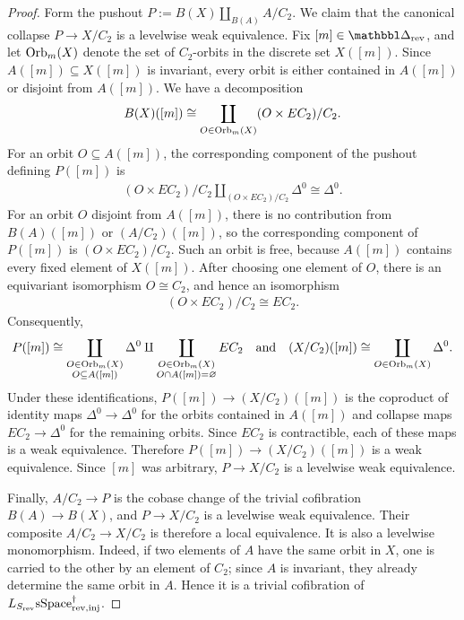 \documentclass[a4paper,dvipdfmx,11pt]{amsart}
\begin{document}
\begin{proof}
  Form the pushout $P:=B(X)\amalg_{B(A)}A/C_2$.
  We claim that the canonical collapse $P \to X/C_2$ is a levelwise weak equivalence.
  Fix $[m]\in\prism_{\rev}$, and let $\operatorname{Orb}_m(X)$ denote the set of $C_2$-orbits in the discrete set $X([m])$.
  Since $A([m])\subseteq X([m])$ is invariant, every orbit is either contained in $A([m])$ or disjoint from $A([m])$.
  We have a decomposition
  \begin{align}
    B(X)([m])
    \cong
    \coprod_{O\in\operatorname{Orb}_m(X)}
    (O\times EC_2)/C_2.
  \end{align}
  For an orbit $O\subseteq A([m])$, the corresponding component of the pushout defining $P([m])$ is
  \begin{align}
    (O\times EC_2)/C_2
    \amalg_{(O\times EC_2)/C_2}
    \Delta^0
    \cong
    \Delta^0.
  \end{align}
  For an orbit $O$ disjoint from $A([m])$, there is no contribution from $B(A)([m])$ or $(A/C_2)([m])$, so the corresponding component of $P([m])$ is $(O\times EC_2)/C_2$.
  Such an orbit is free, because $A([m])$ contains every fixed element of $X([m])$.
  After choosing one element of $O$, there is an equivariant isomorphism $O\cong C_2$, and hence an isomorphism
  \begin{align}
    (O\times EC_2)/C_2
    \cong
    EC_2.
  \end{align}
  Consequently,
  \begin{align}
    P([m])
    \cong
    \coprod_{\substack{O\in\operatorname{Orb}_m(X)\\ O\subseteq A([m])}}
    \Delta^0
    \amalg
    \coprod_{\substack{O\in\operatorname{Orb}_m(X)\\ O\cap A([m])=\varnothing}}
    EC_2
    \quad \text{and} \quad
    (X/C_2)([m])
    \cong
    \coprod_{O\in\operatorname{Orb}_m(X)}
    \Delta^0.
  \end{align}
  Under these identifications, $P([m])\to(X/C_2)([m])$ is the coproduct of identity maps $\Delta^0\to\Delta^0$ for the orbits contained in $A([m])$ and collapse maps $EC_2\to\Delta^0$ for the remaining orbits.
  Since $EC_2$ is contractible, each of these maps is a weak equivalence.
  Therefore $P([m])\to(X/C_2)([m])$ is a weak equivalence.
  Since $[m]$ was arbitrary, $P\to X/C_2$ is a levelwise weak equivalence.

  Finally, $A/C_2\to P$ is the cobase change of the trivial cofibration $B(A)\to B(X)$, and $P\to X/C_2$ is a levelwise weak equivalence.  
  Their composite $A/C_2\to X/C_2$ is therefore a local equivalence.  
  It is also a levelwise monomorphism.
  Indeed, if two elements of $A$ have the same orbit in $X$, one is carried to the other by an element of $C_2$;
  since $A$ is invariant, they already determine the same orbit in $A$.
  Hence it is a trivial cofibration of $L_{S_{\mathrm{rev}}}\mathrm{sSpace}^{\dag}_{\mathrm{rev},\mathrm{inj}}$.
\end{proof}
\end{document}
